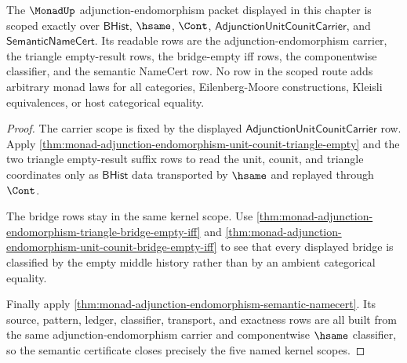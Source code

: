 \begin{theorem}
\label{thm:monad-scoped-kernel-route}
The $\MonadUp$ adjunction-endomorphism packet displayed in this chapter is
scoped exactly over $\mathsf{BHist}$, $\hsame$, $\Cont$,
$\mathsf{AdjunctionUnitCounitCarrier}$, and $\mathsf{SemanticNameCert}$.
Its readable rows are the adjunction-endomorphism carrier, the triangle
empty-result rows, the bridge-empty iff rows, the componentwise classifier, and
the semantic NameCert row. No row in the scoped route adds arbitrary monad laws
for all categories, Eilenberg-Moore constructions, Kleisli equivalences, or host
categorical equality.
\end{theorem}
\begin{proof}
The carrier scope is fixed by the displayed
$\mathsf{AdjunctionUnitCounitCarrier}$ row. Apply
\autoref{thm:monad-adjunction-endomorphism-unit-counit-triangle-empty} and the
two triangle empty-result suffix rows to read the unit, counit, and triangle
coordinates only as $\mathsf{BHist}$ data transported by $\hsame$ and replayed
through $\Cont$.

The bridge rows stay in the same kernel scope. Use
\autoref{thm:monad-adjunction-endomorphism-triangle-bridge-empty-iff} and
\autoref{thm:monad-adjunction-endomorphism-unit-counit-bridge-empty-iff} to see
that every displayed bridge is classified by the empty middle history rather
than by an ambient categorical equality.

Finally apply
\autoref{thm:monad-adjunction-endomorphism-semantic-namecert}. Its source,
pattern, ledger, classifier, transport, and exactness rows are all built from the
same adjunction-endomorphism carrier and componentwise $\hsame$ classifier, so
the semantic certificate closes precisely the five named kernel scopes.
\end{proof}

